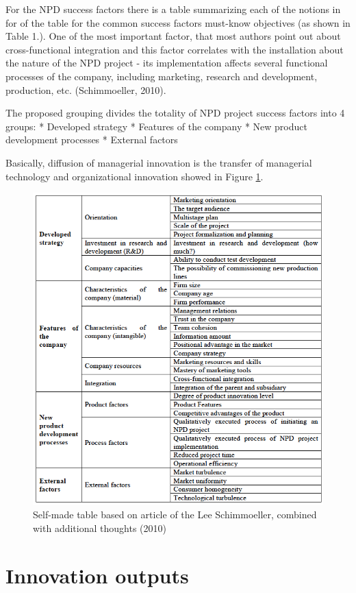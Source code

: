 \documentclass[12pt,twoside]{reedthesis}
\begin{document}
For the NPD success factors there is a table summarizing each of the notions in for of the table for the common success factors must-know objectives (as shown in Table 1.). One of the most important factor, that most authors point out about cross-functional integration and this factor correlates with the installation about the nature of the NPD project - its implementation affects several functional processes of the company, including marketing, research and development, production, etc. (Schimmoeller, 2010).

The proposed grouping divides the totality of NPD project success factors into 4 groups:
* Developed strategy
* Features of the company
* New product development processes
* External factors

Basically, diffusion of managerial innovation is the transfer of managerial technology and organizational innovation showed in Figure \ref{fig:seven}.
\begin{figure}[h]

{\centering \includegraphics[width=0.7\linewidth,]{figure/7} 

}

\caption{Self-made table based on article of the Lee Schimmoeller, combined with additional thoughts (2010)}\label{fig:seven}
\end{figure}
\hypertarget{innovation-outputs}{%
\section{Innovation outputs}\label{innovation-outputs}}
\end{document}
